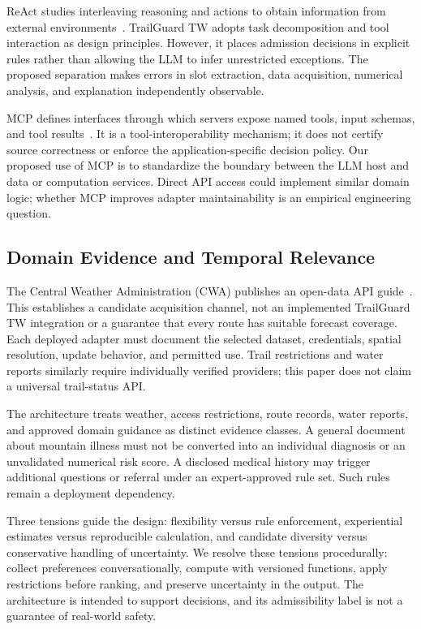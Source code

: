 \documentclass[conference]{IEEEtran}
\begin{document}
ReAct studies interleaving reasoning and actions to obtain information from external environments~\cite{react}. TrailGuard TW adopts task decomposition and tool interaction as design principles. However, it places admission decisions in explicit rules rather than allowing the LLM to infer unrestricted exceptions. The proposed separation makes errors in slot extraction, data acquisition, numerical analysis, and explanation independently observable.

MCP defines interfaces through which servers expose named tools, input schemas, and tool results~\cite{mcp}. It is a tool-interoperability mechanism; it does not certify source correctness or enforce the application-specific decision policy. Our proposed use of MCP is to standardize the boundary between the LLM host and data or computation services. Direct API access could implement similar domain logic; whether MCP improves adapter maintainability is an empirical engineering question.

\subsection{Domain Evidence and Temporal Relevance}
The Central Weather Administration (CWA) publishes an open-data API guide~\cite{cwa}. This establishes a candidate acquisition channel, not an implemented TrailGuard TW integration or a guarantee that every route has suitable forecast coverage. Each deployed adapter must document the selected dataset, credentials, spatial resolution, update behavior, and permitted use. Trail restrictions and water reports similarly require individually verified providers; this paper does not claim a universal trail-status API.

The architecture treats weather, access restrictions, route records, water reports, and approved domain guidance as distinct evidence classes. A general document about mountain illness must not be converted into an individual diagnosis or an unvalidated numerical risk score. A disclosed medical history may trigger additional questions or referral under an expert-approved rule set. Such rules remain a deployment dependency.

Three tensions guide the design: flexibility versus rule enforcement, experiential estimates versus reproducible calculation, and candidate diversity versus conservative handling of uncertainty. We resolve these tensions procedurally: collect preferences conversationally, compute with versioned functions, apply restrictions before ranking, and preserve uncertainty in the output. The architecture is intended to support decisions, and its admissibility label is not a guarantee of real-world safety.
\end{document}

